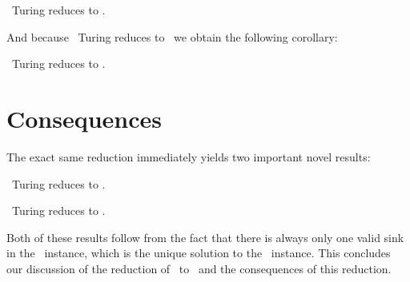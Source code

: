 \begin{theorem}
	\Tarskistar\ Turing reduces to \EndOfPotentialLine\@.
\end{theorem}
And because \Tarski\ Turing reduces to \Tarskistar\ we obtain the following corollary:
\begin{corollary}
	\Tarski\ Turing reduces to \EndOfPotentialLine\@.
\end{corollary}

\section{Consequences}

The exact same reduction immediately yields two important novel results:

\begin{corollary}
	\UniqueTarski\ Turing reduces to \UniqueEndOfPotentialLine\@.
\end{corollary}

\begin{corollary}
	\SuperUniqueTarski\ Turing reduces to \UniqueEndOfPotentialLine\@.
\end{corollary}

Both of these results follow from the fact that there is always only one valid sink in the \EndOfPotentialLine\ instance, which is the unique solution to the \Tarskistar\ instance. This concludes our discussion of the reduction of \Tarskistar\ to \EndOfPotentialLine\ and the consequences of this reduction.